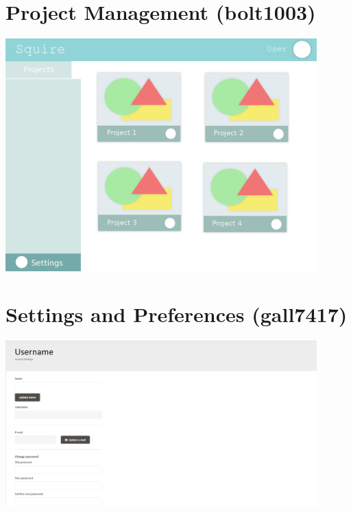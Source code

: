 \documentclass[11pt]{report}
\begin{document}
    \section{Project Management (bolt1003)}
    \begin{minipage}{1\textwidth}
        \begin{center}
            \includegraphics[width=0.9\textwidth]{mockups/mockup-project_management-bolt1003}
        \end{center}
    \end{minipage}
    
    \section{Settings and Preferences (gall7417)}
    \begin{minipage}{1\textwidth}
        \begin{center}
            \includegraphics[width=0.9\textwidth]{mockups/mockup-settings-gall7417}
        \end{center}
    \end{minipage}
    
\end{document}

